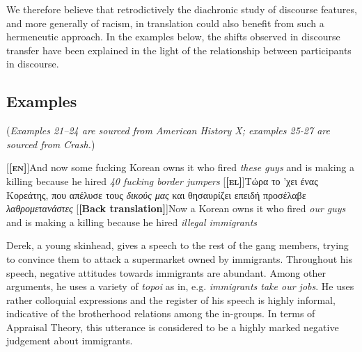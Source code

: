 \documentclass[output=paper]{LSP/langsci}
\begin{document}
We therefore believe that retrodictively \citep{Wright1971,Chesterman2008} the diachronic study of discourse features, and more generally of racism, in translation could also benefit from such a hermeneutic approach. In the examples below, the shifts observed in discourse transfer have been explained in the light of the relationship between participants in discourse.

\subsection{Examples} \label{sec:2:5:1} 
(\textit{Examples 21--24 are sourced from American History X; examples 25-27 are sourced from Crash.})

\ea \label{ex:2:21}
\begin{xlist}
\exi{}[\textbf{[\textsc{en}]}]{And now some fucking Korean owns it who fired \emph{these guys} and is making a killing because he hired \emph{40 fucking border jumpers}}
\exi{}[\textbf{[\textsc{el}]}]{Τώρα το 'χει ένας Κορεάτης, που απέλυσε τους \emph{δικούς μας} και θησαυρίζει επειδή προσέλαβε \emph{λαθρομετανάστες}}
\exi{}[\textbf{[Back translation]}]{Now a Korean owns it who fired \emph{our guys }and is making a killing because he hired \emph{illegal immigrants}}
\end{xlist}
\z

Derek, a young skinhead, gives a speech to the rest of the gang members, trying to convince them to attack a supermarket owned by immigrants. Throughout his speech, negative attitudes towards immigrants are abundant. Among other arguments, he uses a variety of \textit{topoi} as in, e.g. \textit{immigrants take our jobs}. He uses rather colloquial expressions and the register of his speech is highly informal, indicative of the brotherhood relations among the in-groups. In terms of Appraisal Theory, this utterance is considered to be a highly marked negative judgement about immigrants.
\end{document}
